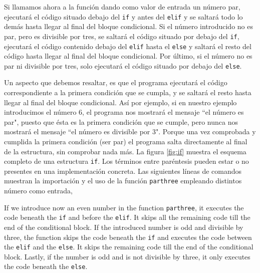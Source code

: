 \begin{paracol}{2}
Si llamamos ahora a la función dando como valor de entrada un número par, ejecutará el código situado debajo del \texttt{if} y antes del \texttt{elif} y se saltará todo lo demás hasta llegar al final del bloque condicional. Si el número introducido no es par, pero es divisible por tres, se saltará el código situado por debajo del \texttt{if}, ejecutará el código contenido debajo del  \texttt{elif} hasta el \texttt{else} y saltará el resto del código hasta llegar al final del bloque condicional. Por último, si el número no es par ni divisible por tres, solo ejecutará el código situado por debajo del \texttt{else}.

Un aspecto que debemos resaltar, es que el programa ejecutará el código correspondiente a la primera condición que se cumpla, y se saltará el resto hasta llegar al final del bloque condicional. Así por ejemplo, si en nuestro ejemplo introducimos el número $6$, el programa nos mostrará el mensaje ``el número es par", puesto que ésta es la primera condición que se cumple, pero nunca nos mostrará el mensaje ``el número es divisible por 3". Porque una vez comprobada y cumplida la primera condición (ser par) el programa salta directamente al final de la estructura, sin comprobar nada más. La figura \ref{fig:if} muestra el esquema completo de una estructura \texttt{if}. Los términos entre paréntesis pueden estar o no presentes en una implementación concreta. Las siguientes líneas de comandos muestran la importación y el uso de la función \texttt{parthree} empleando distintos número como entrada,

\switchcolumn
If we introduce now an even number in the function \texttt{parthree}, it executes the code beneath the \texttt{if} and before the \texttt{elif}. It skips all the remaining code till the end of the conditional block. If the introduced number is odd and divisible by three, the function skips the code beneath the \texttt{if} and executes the code between the \texttt{elif} and the \texttt{else}. It skips the remaining code till the end of the conditional block. Lastly, if the number is odd and is not divisible by three, it only executes the code beneath the \texttt{else}.


\end{paracol}
